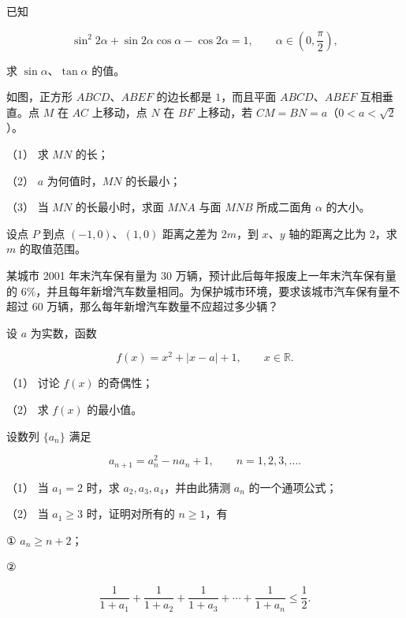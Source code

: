 \begin{question}
已知

\nopagebreak[4]
\[
\sin^2 2\alpha+\sin2\alpha\cos\alpha-\cos2\alpha=1,\qquad
\alpha\in\left(0,\frac\pi2\right),
\]

求 $\sin\alpha\text{、}\tan\alpha$ 的值。

\Needspace{0.4\textheight}
\end{question}
\begin{question}
如图，正方形 $ABCD\text{、}ABEF$ 的边长都是 $1$，而且平面 $ABCD\text{、}ABEF$ 互相垂直。点 $M$ 在 $AC$ 上移动，点 $N$ 在 $BF$ 上移动，若 $CM=BN=a$（$0<a<\sqrt2$）。
\nopagebreak[4]
\begin{center}\end{center}
\nopagebreak[4]
（1） 求 $MN$ 的长；

（2） $a$ 为何值时，$MN$ 的长最小；

（3） 当 $MN$ 的长最小时，求面 $MNA$ 与面 $MNB$ 所成二面角 $\alpha$ 的大小。

\end{question}
\begin{question}
设点 $P$ 到点 $(-1,0)\text{、}(1,0)$ 距离之差为 $2m$，到 $x\text{、}y$ 轴的距离之比为 $2$，求 $m$ 的取值范围。

\end{question}
\begin{question}
某城市 2001 年末汽车保有量为 30 万辆，预计此后每年报废上一年末汽车保有量的 $6\%$，并且每年新增汽车数量相同。为保护城市环境，要求该城市汽车保有量不超过 60 万辆，那么每年新增汽车数量不应超过多少辆？

\end{question}
\begin{question}
设 $a$ 为实数，函数

\nopagebreak[4]
\[
f(x)=x^2+|x-a|+1,\qquad x\in\mathbb R.
\]

（1） 讨论 $f(x)$ 的奇偶性；

（2） 求 $f(x)$ 的最小值。

\end{question}
\begin{question}
设数列 $\{a_n\}$ 满足

\nopagebreak[4]
\[
a_{n+1}=a_n^2-na_n+1,\qquad n=1,2,3,\ldots.
\]

（1） 当 $a_1=2$ 时，求 $a_2,a_3,a_4$，并由此猜测 $a_n$ 的一个通项公式；

（2） 当 $a_1\geqslant3$ 时，证明对所有的 $n\geqslant1$，有

① $a_n\geqslant n+2$；

②

\nopagebreak[4]
\[
\frac1{1+a_1}+\frac1{1+a_2}+\frac1{1+a_3}+\cdots+\frac1{1+a_n}\leqslant\frac12.
\]

\end{question}